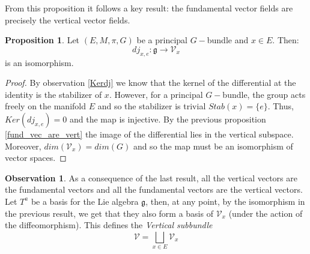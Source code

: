 \documentclass[12pt,a4paper]{report}
\theoremstyle{definition}
\theoremstyle{Theorem}
\newtheorem{Prop}[Def]{Proposition}
\theoremstyle{definition}
\theoremstyle{definition}
\newtheorem{Obs}[Def]{Observation}
\begin{document}
	From this proposition it follows a key result: the fundamental vector fields are precisely the vertical vector fields.
	\begin{Prop}
		Let $(E,M,\pi,G)$ be a principal $G-$bundle and $x\in E$. Then: 
		$$dj_{x,e}:\mathfrak{g}\rightarrow \mathcal{V}_{x}$$ is an isomorphism.
	\end{Prop}
	\begin{proof}
		By observation \ref{Kerdj} we know that the kernel of the differential at the identity is the stabilizer of $x$. However, for a principal $G-$bundle, the group acts freely on the manifold $E$ and so the stabilizer is trivial $Stab(x)=\{e\}$. Thus, $Ker (dj_{x,e})=0$ and the map is injective. By the previous proposition \ref{fund_vec_are_vert} the image of the differential lies in the vertical subspace. Moreover, $dim(\mathcal{V}_{x})=dim(G)$ and so the map must be an isomorphism of vector spaces.			
	\end{proof}
	\begin{Obs}
		As a consequence of the last result, all the vertical vectors are the fundamental vectors and all the fundamental vectors are the vertical vectors.\\
		Let $T^a$ be a basis for the Lie algebra $\mathfrak{g}$, then, at any point, by the isomorphism in the previous result, we get that they also form a basis of $\mathcal{V}_{x}$ (under the action of the diffeomorphism). This defines the \textit{Vertical subbundle} $$\mathcal{V}=\bigsqcup_{x\in E}\mathcal{V}_{x}$$
	\end{Obs}
\end{document}
